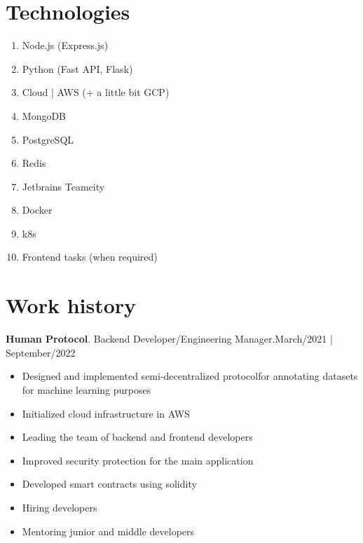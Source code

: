 \documentclass{article}
\begin{document}
\vspace{-2em}
\section*{Technologies}
\begin{multicols}{2}
    \begin{enumerate}
        \item Node.js (Express.js)
        \item Python (Fast API, Flask)
        \item Cloud | AWS (+ a little bit GCP)
        \item MongoDB
        \item PostgreSQL
        \item Redis
        \item Jetbrains Teamcity
        \item Docker
        \item k8s
        \item Frontend tasks (when required)
    \end{enumerate}
\end{multicols}


\section*{Work history}

\textbf{Human Protocol}. Backend Developer/Engineering Manager.\hspace*{0pt}\hfill March/2021 | September/2022

\begin{itemize}
 \item Designed and implemented semi-decentralized protocolfor annotating datasets for machine learning purposes
 \item Initialized cloud infrastructure in AWS
 \item Leading the team of backend and frontend developers
 \item Improved security protection for the main application
 \item Developed smart contracts using solidity
 \item Hiring developers
 \item Mentoring junior and middle developers
\end{itemize}
\end{document}
